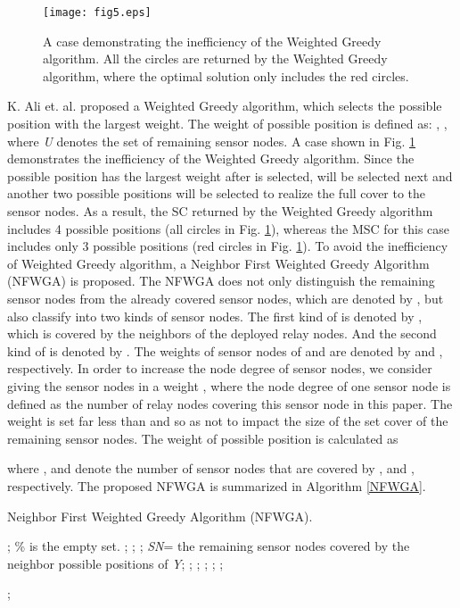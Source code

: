 \documentclass[journal]{IEEEtran}
\begin{document}
\begin{figure}
\begin{center}
\texttt{[image: fig5.eps]}    \caption{A case demonstrating the inefficiency of the Weighted Greedy algorithm. All the circles are returned by the Weighted Greedy algorithm, where the optimal solution only includes the red circles.}
\label{fig5}                                 \end{center}                                 \end{figure}

K. Ali et. al. \cite{Ali11} proposed a Weighted Greedy algorithm, which selects the possible position with the largest weight. The weight of possible position  is defined as: , , where \emph{U} denotes the set of remaining sensor nodes. A case shown in Fig. \ref{fig5} demonstrates the inefficiency of the Weighted Greedy algorithm. Since the possible position  has the largest weight after  is selected,  will be selected next and another two possible positions will be selected to realize the full cover to the sensor nodes. As a result, the SC returned by the Weighted Greedy algorithm includes 4 possible positions (all circles in Fig. \ref{fig5}), whereas the MSC for this case includes only 3 possible positions (red circles in Fig. \ref{fig5}). To avoid the inefficiency of Weighted Greedy algorithm, a Neighbor First Weighted Greedy Algorithm (NFWGA) is proposed.
The NFWGA does not only distinguish the remaining sensor nodes  from the already covered sensor nodes, which are denoted by , but also classify  into two kinds of sensor nodes. The first kind of  is denoted by , which is covered by the neighbors of the deployed relay nodes. And the second kind of  is denoted by . The weights of sensor nodes of  and  are denoted by  and , respectively. In order to increase the node degree of sensor nodes, we consider giving the sensor nodes in  a weight , where the node degree of one sensor node is defined as the number of relay nodes covering this sensor node in this paper. The weight  is set far less than  and  so as not to impact the size of the set cover of the remaining sensor nodes. The weight of possible position  is calculated as

where ,  and  denote the number of sensor nodes that are covered by ,  and , respectively. The proposed NFWGA is summarized in Algorithm \ref{NFWGA}.


\begin{algorithm}[htb]         \caption{Neighbor First Weighted Greedy Algorithm (NFWGA).}             
\label{NFWGA}                  
\begin{algorithmic}[1]                
\STATE ; \% is the empty set.
\STATE ;
\STATE ;
\STATE ;
\WHILE{}
\STATE \emph{SN}= the remaining sensor nodes covered by the neighbor possible positions of \emph{Y};
\FORALL {}
\STATE ;
\ENDFOR
\STATE ;
\STATE ;
\STATE ;
\STATE ;
\ENDWHILE

\RETURN ;                
\end{algorithmic}

\end{algorithm}
\end{document}
